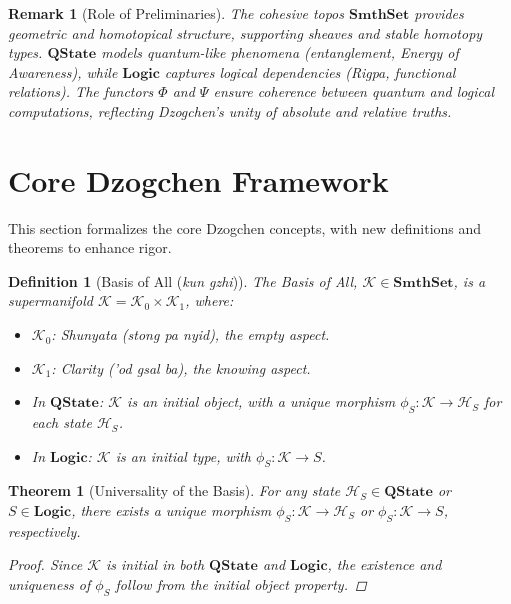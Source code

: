 \documentclass{article}
\newtheorem{theorem}{Theorem}[section]
\newtheorem{definition}{Definition}[section]
\newtheorem{remark}{Remark}[section]
\begin{document}
\begin{remark}[Role of Preliminaries]
The cohesive topos \(\mathbf{SmthSet}\) provides geometric and homotopical structure, supporting sheaves and stable homotopy types. \(\mathbf{QState}\) models quantum-like phenomena (entanglement, Energy of Awareness), while \(\mathbf{Logic}\) captures logical dependencies (Rigpa, functional relations). The functors \(\Phi\) and \(\Psi\) ensure coherence between quantum and logical computations, reflecting Dzogchen’s unity of absolute and relative truths.
\end{remark}

\section{Core Dzogchen Framework}
This section formalizes the core Dzogchen concepts, with new definitions and theorems to enhance rigor.

\begin{definition}[Basis of All (\textit{kun gzhi})]
The Basis of All, \(\mathcal{K} \in \mathbf{SmthSet}\), is a supermanifold \(\mathcal{K} = \mathcal{K}_0 \times \mathcal{K}_1\), where:
\begin{itemize}
    \item \(\mathcal{K}_0\): Shunyata (\textit{stong pa nyid}), the empty aspect.
    \item \(\mathcal{K}_1\): Clarity (\textit{'od gsal ba}), the knowing aspect.
\end{itemize}
\begin{itemize}
    \item In \(\mathbf{QState}\): \(\mathcal{K}\) is an initial object, with a unique morphism \(\phi_S: \mathcal{K} \to \mathcal{H}_S\) for each state \(\mathcal{H}_S\).
    \item In \(\mathbf{Logic}\): \(\mathcal{K}\) is an initial type, with \(\phi_S: \mathcal{K} \to S\).
\end{itemize}
\end{definition}

\begin{theorem}[Universality of the Basis]
For any state \(\mathcal{H}_S \in \mathbf{QState}\) or \(S \in \mathbf{Logic}\), there exists a unique morphism \(\phi_S: \mathcal{K} \to \mathcal{H}_S\) or \(\phi_S: \mathcal{K} \to S\), respectively.
\begin{proof}
Since \(\mathcal{K}\) is initial in both \(\mathbf{QState}\) and \(\mathbf{Logic}\), the existence and uniqueness of \(\phi_S\) follow from the initial object property.
\end{proof}
\end{theorem}
\end{document}

